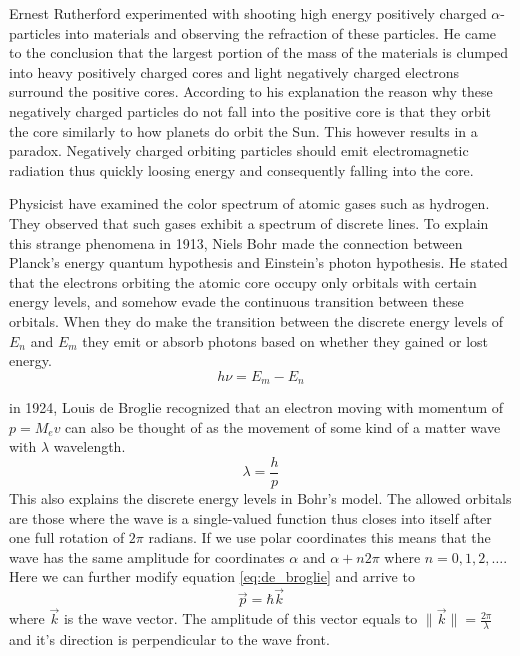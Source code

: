 Ernest Rutherford experimented with shooting high energy positively charged $\alpha$-particles into materials and observing the refraction of these particles.
He came to the conclusion that the largest portion of the mass of the materials is clumped into heavy positively charged cores and light negatively charged electrons surround the positive cores.
According to his explanation the reason why these negatively charged particles do not fall into the positive core is that they orbit the core similarly to how planets do orbit the Sun.
This however results in a paradox.
Negatively charged orbiting particles should emit electromagnetic radiation thus quickly loosing energy and consequently falling into the core.

Physicist have examined the color spectrum of atomic gases such as hydrogen.
They observed that such gases exhibit a spectrum of discrete lines.
To explain this strange phenomena in 1913, Niels Bohr made the connection between Planck's energy quantum hypothesis and Einstein's photon hypothesis.
He stated that the electrons orbiting the atomic core occupy only orbitals with certain energy levels, and somehow evade the continuous transition between these orbitals.
When they do make the transition between the discrete energy levels of $E_n$ and $E_m$ they emit or absorb photons based on whether they gained or lost energy.
\begin{equation}
	h\nu = E_m - E_n
\end{equation}

in 1924, Louis de Broglie recognized that an electron moving with momentum of $p=M_ev$ can also be thought of as the movement of some kind of a matter wave with $\lambda$ wavelength.
\begin{equation}
	\label{eq:de_broglie}
	\lambda = \frac{h}{p}
\end{equation}
This also explains the discrete energy levels in Bohr's model.
The allowed orbitals are those where the wave is a single-valued function thus closes into itself after one full rotation of $2\pi$ radians.
If we use polar coordinates this means that the wave has the same amplitude for coordinates $\alpha$ and $\alpha + n2\pi$ where $n = 0, 1, 2, \dots$.
Here we can further modify equation \ref{eq:de_broglie} and arrive to
\begin{equation}
	\vec{p} = \hbar \vec{k}
\end{equation}
where $\vec{k}$ is the wave vector. The amplitude of this vector equals to $\|\vec{k}\|= \frac{2\pi}{\lambda}$ and it's direction is perpendicular to the wave front.

